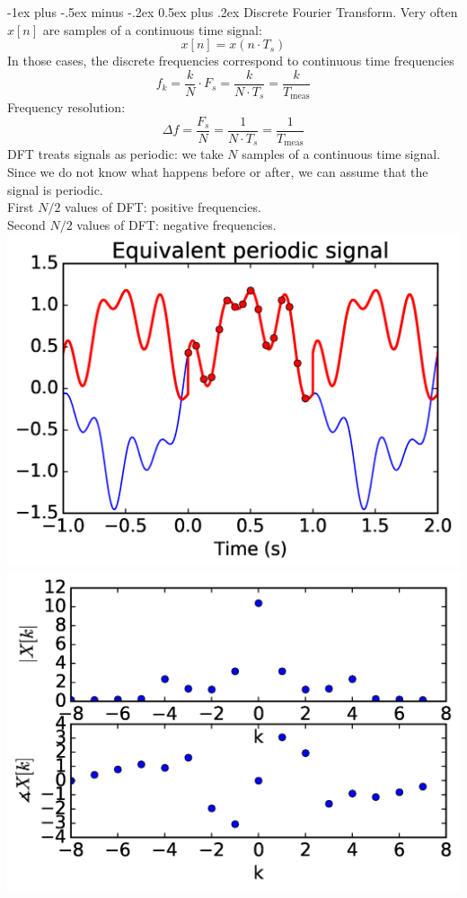 \documentclass[10pt,landscape,a4paper]{article}
\makeatletter
\renewcommand{\section}{\@startsection{section}{1}{0mm}%
	{-1ex plus -.5ex minus -.2ex}%
	{0.5ex plus .2ex}%
	{\normalfont\large\bfseries}}
\makeatother
\begin{document}
\begin{multicols}{3}
	\section{Discrete Fourier Transform.}
	Very often $ x[n] $ are samples of a continuous time signal:
	\[
		x[n] = x(n\cdot T_s)
	\]
	In those cases, the discrete frequencies correspond to continuous time frequencies
	\[
		f_k = \frac{k}{N}\cdot F_s = \frac{k}{N\cdot T_s} = \frac{k}{T_{\text{meas}}}
	\]
	Frequency resolution:
	\[
		\Delta f=\frac{F_s}{N}=\frac{1}{N\cdot T_s}=\frac{1}{T_{\text{meas}}}
	\]
	DFT treats signals as periodic: we take $ N $ samples of a continuous time signal. Since we do not know what happens before or after, we can assume that the signal is periodic.\\
	First $ N/2 $ values of DFT: positive frequencies.\\
	Second $ N/2 $ values of DFT: negative frequencies.\\
	\includegraphics[width=\textwidth/5]{dft-equivalent-signal}\\
	\includegraphics[width=\textwidth/5]{dft-result}\\
	

\end{multicols}
\end{document}
